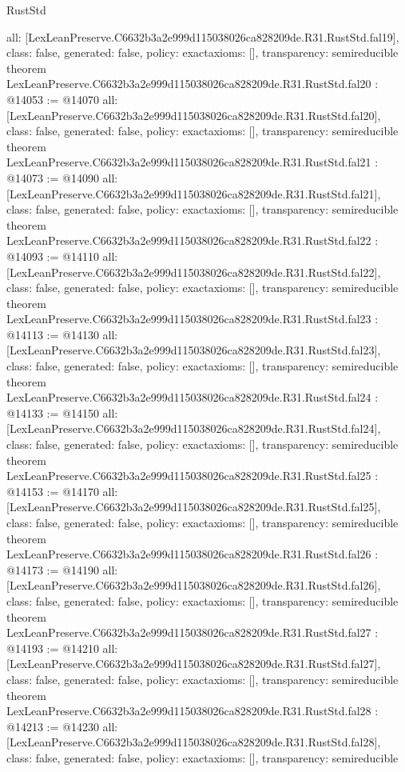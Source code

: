 \begin{lexlean}{RustStd}
\begin{coremodule}
{  all: [LexLeanPreserve.C6632b3a2e999d115038026ca828209de.R31.RustStd.fal19],
  class: false,
  generated: false,
  policy: exact{axioms: []},
  transparency: semireducible
}
theorem LexLeanPreserve.C6632b3a2e999d115038026ca828209de.R31.RustStd.fal20 : @14053 := @14070 {
  all: [LexLeanPreserve.C6632b3a2e999d115038026ca828209de.R31.RustStd.fal20],
  class: false,
  generated: false,
  policy: exact{axioms: []},
  transparency: semireducible
}
theorem LexLeanPreserve.C6632b3a2e999d115038026ca828209de.R31.RustStd.fal21 : @14073 := @14090 {
  all: [LexLeanPreserve.C6632b3a2e999d115038026ca828209de.R31.RustStd.fal21],
  class: false,
  generated: false,
  policy: exact{axioms: []},
  transparency: semireducible
}
theorem LexLeanPreserve.C6632b3a2e999d115038026ca828209de.R31.RustStd.fal22 : @14093 := @14110 {
  all: [LexLeanPreserve.C6632b3a2e999d115038026ca828209de.R31.RustStd.fal22],
  class: false,
  generated: false,
  policy: exact{axioms: []},
  transparency: semireducible
}
theorem LexLeanPreserve.C6632b3a2e999d115038026ca828209de.R31.RustStd.fal23 : @14113 := @14130 {
  all: [LexLeanPreserve.C6632b3a2e999d115038026ca828209de.R31.RustStd.fal23],
  class: false,
  generated: false,
  policy: exact{axioms: []},
  transparency: semireducible
}
theorem LexLeanPreserve.C6632b3a2e999d115038026ca828209de.R31.RustStd.fal24 : @14133 := @14150 {
  all: [LexLeanPreserve.C6632b3a2e999d115038026ca828209de.R31.RustStd.fal24],
  class: false,
  generated: false,
  policy: exact{axioms: []},
  transparency: semireducible
}
theorem LexLeanPreserve.C6632b3a2e999d115038026ca828209de.R31.RustStd.fal25 : @14153 := @14170 {
  all: [LexLeanPreserve.C6632b3a2e999d115038026ca828209de.R31.RustStd.fal25],
  class: false,
  generated: false,
  policy: exact{axioms: []},
  transparency: semireducible
}
theorem LexLeanPreserve.C6632b3a2e999d115038026ca828209de.R31.RustStd.fal26 : @14173 := @14190 {
  all: [LexLeanPreserve.C6632b3a2e999d115038026ca828209de.R31.RustStd.fal26],
  class: false,
  generated: false,
  policy: exact{axioms: []},
  transparency: semireducible
}
theorem LexLeanPreserve.C6632b3a2e999d115038026ca828209de.R31.RustStd.fal27 : @14193 := @14210 {
  all: [LexLeanPreserve.C6632b3a2e999d115038026ca828209de.R31.RustStd.fal27],
  class: false,
  generated: false,
  policy: exact{axioms: []},
  transparency: semireducible
}
theorem LexLeanPreserve.C6632b3a2e999d115038026ca828209de.R31.RustStd.fal28 : @14213 := @14230 {
  all: [LexLeanPreserve.C6632b3a2e999d115038026ca828209de.R31.RustStd.fal28],
  class: false,
  generated: false,
  policy: exact{axioms: []},
  transparency: semireducible
}
\end{coremodule}
\end{lexlean}
